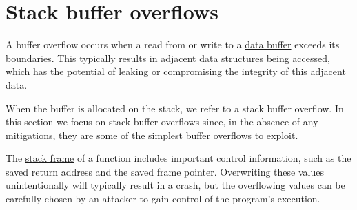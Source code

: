 \documentclass[
  a4paper,
]{report}
\begin{document}
\section{Stack buffer overflows}\label{stack-buffer-overflows}

A buffer overflow occurs when a read from or write to a
\href{https://en.wikipedia.org/wiki/Data_buffer}{data buffer} exceeds
its boundaries. This typically results in adjacent data structures being
accessed, which has the potential of leaking or compromising the
integrity of this adjacent data.

When the buffer is allocated on the stack, we refer to a stack buffer
overflow. In this section we focus on stack buffer overflows since, in
the absence of any mitigations, they are some of the simplest buffer
overflows to exploit.

The \href{https://en.wikipedia.org/wiki/Call_stack}{stack frame} of a
function includes important control information, such as the saved
return address and the saved frame pointer. Overwriting these values
unintentionally will typically result in a crash, but the overflowing
values can be carefully chosen by an attacker to gain control of the
program's execution.
\end{document}
